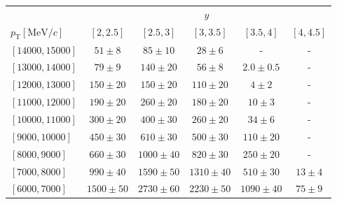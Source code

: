 \renewcommand{\arraystretch}{1.0}
\begin{tabular}{lr@{\hskip+0.2em}c@{\hskip+0.2em}r@{\hskip+0.2em}c@{\hskip+0.2em}rr@{\hskip+0.2em}c@{\hskip+0.2em}r@{\hskip+0.2em}c@{\hskip+0.2em}rr@{\hskip+0.2em}c@{\hskip+0.2em}r@{\hskip+0.2em}c@{\hskip+0.2em}rr@{\hskip+0.2em}c@{\hskip+0.2em}r@{\hskip+0.2em}c@{\hskip+0.2em}rr@{\hskip+0.2em}c@{\hskip+0.2em}r@{\hskip+0.2em}c@{\hskip+0.2em}r}
\toprule&\multicolumn{25}{c}{$y$}\\
$p_{\text{T}} [\text{MeV}/c]$ & \multicolumn{5}{c}{$[2,2.5]$} & \multicolumn{5}{c}{$[2.5,3]$} & \multicolumn{5}{c}{$[3,3.5]$} & \multicolumn{5}{c}{$[3.5,4]$} & \multicolumn{5}{c}{$[4,4.5]$} \\
\midrule$[14000,15000]$ & \multicolumn{5}{c}{$51 \pm 8$} & \multicolumn{5}{c}{$85 \pm 10$} & \multicolumn{5}{c}{$28 \pm 6$} & \multicolumn{5}{c}{-} & \multicolumn{5}{c}{-} \\
$[13000,14000]$ & \multicolumn{5}{c}{$79 \pm 9$} & \multicolumn{5}{c}{$140 \pm 20$} & \multicolumn{5}{c}{$56 \pm 8$} & \multicolumn{5}{c}{$2.0 \pm 0.5$} & \multicolumn{5}{c}{-} \\
$[12000,13000]$ & \multicolumn{5}{c}{$150 \pm 20$} & \multicolumn{5}{c}{$150 \pm 20$} & \multicolumn{5}{c}{$110 \pm 20$} & \multicolumn{5}{c}{$4 \pm 2$} & \multicolumn{5}{c}{-} \\
$[11000,12000]$ & \multicolumn{5}{c}{$190 \pm 20$} & \multicolumn{5}{c}{$260 \pm 20$} & \multicolumn{5}{c}{$180 \pm 20$} & \multicolumn{5}{c}{$10 \pm 3$} & \multicolumn{5}{c}{-} \\
$[10000,11000]$ & \multicolumn{5}{c}{$300 \pm 20$} & \multicolumn{5}{c}{$400 \pm 30$} & \multicolumn{5}{c}{$260 \pm 20$} & \multicolumn{5}{c}{$34 \pm 6$} & \multicolumn{5}{c}{-} \\
$[9000,10000]$ & \multicolumn{5}{c}{$450 \pm 30$} & \multicolumn{5}{c}{$610 \pm 30$} & \multicolumn{5}{c}{$500 \pm 30$} & \multicolumn{5}{c}{$110 \pm 20$} & \multicolumn{5}{c}{-} \\
$[8000,9000]$ & \multicolumn{5}{c}{$660 \pm 30$} & \multicolumn{5}{c}{$1000 \pm 40$} & \multicolumn{5}{c}{$820 \pm 30$} & \multicolumn{5}{c}{$250 \pm 20$} & \multicolumn{5}{c}{-} \\
$[7000,8000]$ & \multicolumn{5}{c}{$990 \pm 40$} & \multicolumn{5}{c}{$1590 \pm 50$} & \multicolumn{5}{c}{$1310 \pm 40$} & \multicolumn{5}{c}{$510 \pm 30$} & \multicolumn{5}{c}{$13 \pm 4$} \\
$[6000,7000]$ & \multicolumn{5}{c}{$1500 \pm 50$} & \multicolumn{5}{c}{$2730 \pm 60$} & \multicolumn{5}{c}{$2230 \pm 50$} & \multicolumn{5}{c}{$1090 \pm 40$} & \multicolumn{5}{c}{$75 \pm 9$} \\

\end{tabular}
